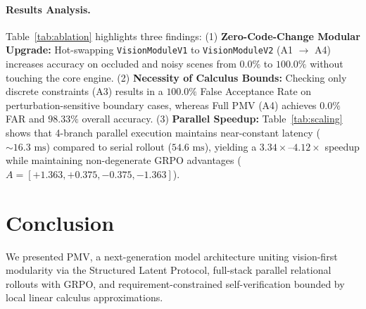 \documentclass[10pt,twocolumn]{article}
\begin{document}
\paragraph{Results Analysis.}
Table~\ref{tab:ablation} highlights three findings:
(1) \textbf{Zero-Code-Change Modular Upgrade:} Hot-swapping \texttt{VisionModuleV1} to \texttt{VisionModuleV2} (A1 $\rightarrow$ A4) increases accuracy on occluded and noisy scenes from $0.0\%$ to $100.0\%$ without touching the core engine.
(2) \textbf{Necessity of Calculus Bounds:} Checking only discrete constraints (A3) results in a $100.0\%$ False Acceptance Rate on perturbation-sensitive boundary cases, whereas Full PMV (A4) achieves $0.0\%$ FAR and $98.33\%$ overall accuracy.
(3) \textbf{Parallel Speedup:} Table~\ref{tab:scaling} shows that 4-branch parallel execution maintains near-constant latency ($\sim 16.3\text{ ms}$) compared to serial rollout ($54.6\text{ ms}$), yielding a $3.34\times$--$4.12\times$ speedup while maintaining non-degenerate GRPO advantages ($A = [+1.363, +0.375, -0.375, -1.363]$).

\section{Conclusion}
We presented PMV, a next-generation model architecture uniting vision-first modularity via the Structured Latent Protocol, full-stack parallel relational rollouts with GRPO, and requirement-constrained self-verification bounded by local linear calculus approximations.
\end{document}
